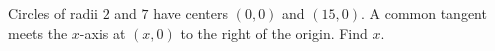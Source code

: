 Circles of radii $2$ and $7$ have centers $(0,0)$ and $(15,0)$. A common tangent meets the $x$-axis at $(x,0)$ to the right of the origin. Find $x$.
